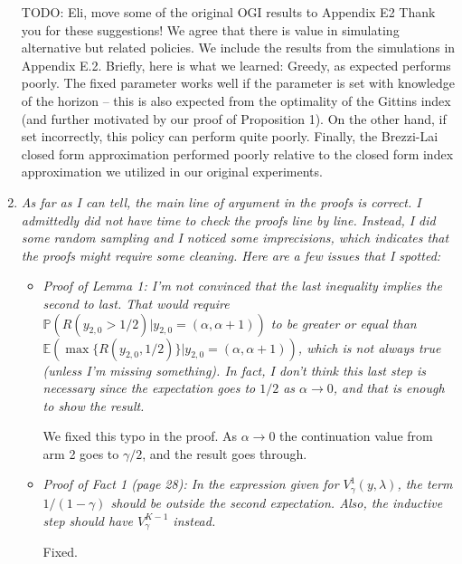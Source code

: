 \documentclass[11pt]{article}
\newcommand{\1}{\ensuremath{\mathbf{1}}} %
\theoremstyle{thm-sf}
\begin{document}
\begin{enumerate}
	
	{\color{blue} TODO: Eli, move some of the original OGI results to Appendix E2}
	Thank you for these suggestions! We agree that there is value in simulating alternative but related policies. We include the results from the simulations in Appendix E.2. Briefly, here is what we learned: Greedy, as expected performs poorly. The fixed parameter works well if the parameter is set with knowledge of the horizon -- this is also expected from the optimality of the Gittins index (and further motivated by our proof of Proposition 1). On the other hand, if set incorrectly, this policy can perform quite poorly. Finally, the Brezzi-Lai closed form approximation performed poorly relative to the closed form index approximation we utilized in our original experiments. 
	
	

	\item {\it As far as I can tell, the main line of argument in the proofs is correct. I admittedly did not have time to check the proofs line by line. Instead, I did some random sampling and I noticed some imprecisions, which indicates that the proofs might require some cleaning. Here are a few issues that I spotted:}
		
		\begin{itemize}
			\item {\it Proof of Lemma 1: I'm not convinced that the last inequality implies the second to last.
			 That would require $\mathbb P(R(y_{2,0} > 1/2)| y_{2,0} = (\alpha, \alpha + 1))$ to be greater or equal than $\mathbb E (\max \{R(y_{2,0}, 1/2 )\} | y_{2,0} = (\alpha, \alpha + 1))$, which is not always true (unless I'm missing something).
			 In fact, I don't think this last step is necessary since the expectation goes to $1/2$ as $\alpha \to 0$, and that is enough to show the result.}
			 
			 We fixed this typo in the proof. As $\alpha \to 0$ the continuation value from arm 2 goes to $\gamma/2$, and the result goes through.
			 
			 \item {\it Proof of Fact 1 (page 28): In the expression given for $V^1_\gamma(y, \lambda)$, the term $1/(1-\gamma)$ should be outside the second expectation. Also, the inductive step should have $V^{K-1}_\gamma$ instead.}
			 
			 Fixed.
			 

\end{itemize}
\end{enumerate}
\end{document}
